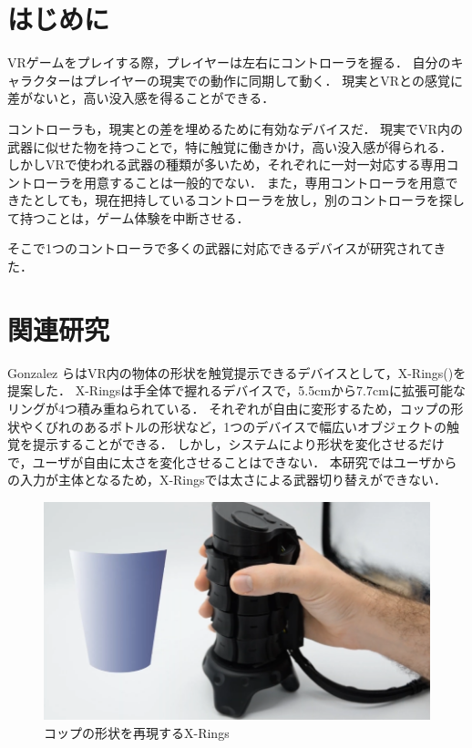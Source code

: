 \documentclass[uplatex]{jsarticle}
\begin{document}
\vspace{3mm}

\setcounter{page}{17}

\section{はじめに}

VRゲームをプレイする際，プレイヤーは左右にコントローラを握る．
自分のキャラクターはプレイヤーの現実での動作に同期して動く．
現実とVRとの感覚に差がないと，高い没入感を得ることができる．

コントローラも，現実との差を埋めるために有効なデバイスだ．
現実でVR内の武器に似せた物を持つことで，特に触覚に働きかけ，高い没入感が得られる．
しかしVRで使われる武器の種類が多いため，それぞれに一対一対応する専用コントローラを用意することは一般的でない．
また，専用コントローラを用意できたとしても，現在把持しているコントローラを放し，別のコントローラを探して持つことは，ゲーム体験を中断させる．

そこで1つのコントローラで多くの武器に対応できるデバイスが研究されてきた．


\section{関連研究}

Gonzalez らはVR内の物体の形状を触覚提示できるデバイスとして，X-Rings()を提案した\cite{gonzalez2021x-rings}．
X-Ringsは手全体で握れるデバイスで，5.5cmから7.7cmに拡張可能なリングが4つ積み重ねられている．
それぞれが自由に変形するため，コップの形状やくびれのあるボトルの形状など，1つのデバイスで幅広いオブジェクトの触覚を提示することができる．
しかし，システムにより形状を変化させるだけで，ユーザが自由に太さを変化させることはできない．
本研究ではユーザからの入力が主体となるため，X-Ringsでは太さによる武器切り替えができない．

\begin{figure}[htbp]
    \centering
    \includegraphics[width=0.9\linewidth]{fig/X-Rings.png}
    \caption{コップの形状を再現するX-Rings}
    \label{fig:X-Rings}
\end{figure}
\end{document}

